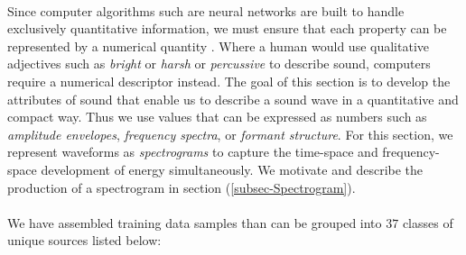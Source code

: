 \documentclass[12pt,letterpaper]{article}
\begin{document}
\paragraph*{}Since computer algorithms such are neural networks are built to handle exclusively quantitative information, we must ensure that each property can be represented by a numerical quantity \cite{Geron,Levine}. Where a human would use qualitative adjectives such as \textit{bright} or \textit{harsh} or \textit{percussive} to describe sound, computers require a numerical descriptor instead. The goal of this section is to develop the attributes of sound that enable us to describe a sound wave in a quantitative and compact way. Thus we use values that can be expressed as numbers such as \textit{amplitude envelopes}, \textit{frequency spectra}, or \textit{formant structure}. For this section, we represent waveforms as \textit{spectrograms} to capture the time-space and frequency-space development of energy simultaneously. We motivate and describe the production of a spectrogram in section (\ref{subsec-Spectrogram}).

\paragraph*{}We have assembled training data samples than can be grouped into $37$ classes of unique sources listed below:
\end{document}
